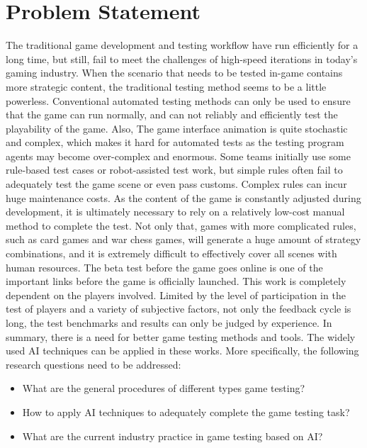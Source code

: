 \documentclass[11pt,en,number]{elegantpaper}
\begin{document}
\section{Problem Statement}
\noindent
The traditional game development and testing workflow have run efficiently for a long time, but still, fail to meet the challenges of high-speed iterations in today's gaming industry.
When the scenario that needs to be tested in-game contains more strategic content, the traditional testing method seems to be a little powerless. Conventional automated testing methods can only be used to ensure that the game can run normally, and can not reliably and efficiently test the playability of the game. Also, The game interface animation is quite stochastic and complex, which makes it hard for automated tests as the testing program agents may become over-complex and enormous. Some teams initially use some rule-based test cases or robot-assisted test work, but simple rules often fail to adequately test the game scene or even pass customs. Complex rules can incur huge maintenance costs. As the content of the game is constantly adjusted during development, it is ultimately necessary to rely on a relatively low-cost manual method to complete the test. Not only that, games with more complicated rules, such as card games and war chess games, will generate a huge amount of strategy combinations, and it is extremely difficult to effectively cover all scenes with human resources. The beta test before the game goes online is one of the important links before the game is officially launched. This work is completely dependent on the players involved. Limited by the level of participation in the test of players and a variety of subjective factors, not only the feedback cycle is long, the test benchmarks and results can only be judged by experience. In summary, there is a need for better game testing methods and tools. The widely used AI techniques can be applied in these works. More specifically, the following research questions need to be addressed:
\begin{itemize}
    \item What are the general procedures of different types game testing?
    \item How to apply AI techniques to adequately complete the game testing task?
    \item What are the current industry practice in game testing based on AI?
\end{itemize}
\end{document}
